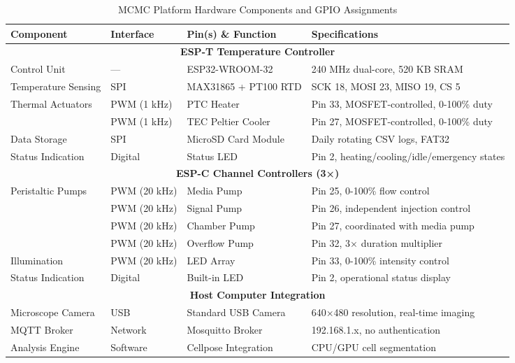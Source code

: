 \begin{table}[H]
\centering
\caption{MCMC Platform Hardware Components and GPIO Assignments}
\begin{tabularx}{\textwidth}{|l|l|X|l|}
\hline
\textbf{Component} & \textbf{Interface} & \textbf{Pin(s) \& Function} & \textbf{Specifications} \\
\hline
\multicolumn{4}{|c|}{\textbf{ESP-T Temperature Controller}} \\
\hline
Control Unit & --- & ESP32-WROOM-32 & 240 MHz dual-core, 520 KB SRAM \\
\hline
Temperature Sensing & SPI & MAX31865 + PT100 RTD & SCK 18, MOSI 23, MISO 19, CS 5 \\
\hline
Thermal Actuators & PWM (1 kHz) & PTC Heater & Pin 33, MOSFET-controlled, 0-100\% duty \\
\hline
 & PWM (1 kHz) & TEC Peltier Cooler & Pin 27, MOSFET-controlled, 0-100\% duty \\
\hline
Data Storage & SPI & MicroSD Card Module & Daily rotating CSV logs, FAT32 \\
\hline
Status Indication & Digital & Status LED & Pin 2, heating/cooling/idle/emergency states \\
\hline
\multicolumn{4}{|c|}{\textbf{ESP-C Channel Controllers (3×)}} \\
\hline
Peristaltic Pumps & PWM (20 kHz) & Media Pump & Pin 25, 0-100\% flow control \\
\hline
 & PWM (20 kHz) & Signal Pump & Pin 26, independent injection control \\
\hline
 & PWM (20 kHz) & Chamber Pump & Pin 27, coordinated with media pump \\
\hline
 & PWM (20 kHz) & Overflow Pump & Pin 32, 3× duration multiplier \\
\hline
Illumination & PWM (20 kHz) & LED Array & Pin 33, 0-100\% intensity control \\
\hline
Status Indication & Digital & Built-in LED & Pin 2, operational status display \\
\hline
\multicolumn{4}{|c|}{\textbf{Host Computer Integration}} \\
\hline
Microscope Camera & USB & Standard USB Camera & 640×480 resolution, real-time imaging \\
\hline
MQTT Broker & Network & Mosquitto Broker & 192.168.1.x, no authentication \\
\hline
Analysis Engine & Software & Cellpose Integration & CPU/GPU cell segmentation \\
\hline
\end{tabularx}
\end{table}

